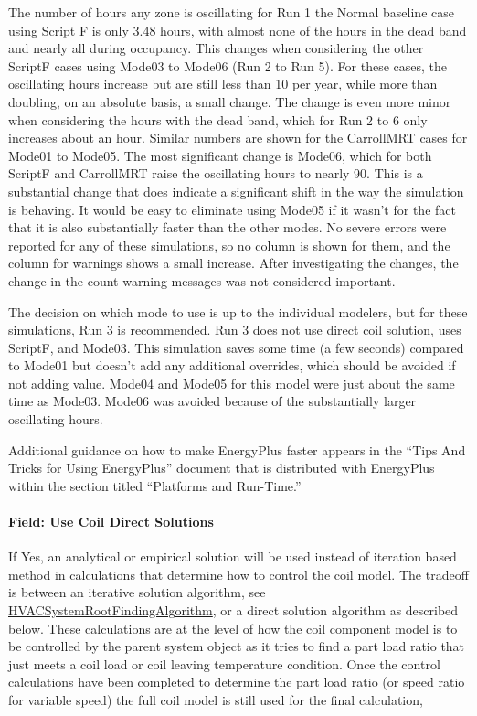 The number of hours any zone is oscillating for Run 1 the Normal baseline case using Script F is only 3.48 hours, with almost none of the hours in the dead band and nearly all during occupancy. This changes when considering the other ScriptF cases using Mode03 to Mode06 (Run 2 to Run 5).  For these cases, the oscillating hours increase but are still less than 10 per year, while more than doubling, on an absolute basis, a small change. The change is even more minor when considering the hours with the dead band, which for Run 2 to 6 only increases about an hour. Similar numbers are shown for the CarrollMRT cases for Mode01 to Mode05. The most significant change is Mode06, which for both ScriptF and CarrollMRT raise the oscillating hours to nearly 90. This is a substantial change that does indicate a significant shift in the way the simulation is behaving. It would be easy to eliminate using Mode05 if it wasn’t for the fact that it is also substantially faster than the other modes. No severe errors were reported for any of these simulations, so no column is shown for them, and the column for warnings shows a small increase. After investigating the changes, the change in the count warning messages was not considered important.

The decision on which mode to use is up to the individual modelers, but for these simulations, Run 3 is recommended. Run 3 does not use direct coil solution, uses ScriptF, and Mode03. This simulation saves some time (a few seconds) compared to Mode01 but doesn’t add any additional overrides, which should be avoided if not adding value. Mode04 and Mode05 for this model were just about the same time as Mode03.  Mode06 was avoided because of the substantially larger oscillating hours.

Additional guidance on how to make EnergyPlus faster appears in the ``Tips And Tricks for Using EnergyPlus'' document that is distributed with EnergyPlus within the section titled ``Platforms and Run-Time.''


\paragraph{Field: Use Coil Direct Solutions}\label{use-coil-direct-solutions}

If Yes, an analytical or empirical solution will be used instead of iteration based method in calculations that determine how to control the coil model.  The tradeoff is between an iterative solution algorithm, see \hyperref[hvacystemrootfindingalgorithm]{HVACSystemRootFindingAlgorithm}, or a direct solution algorithm as described below.  These calculations are at the level of how the coil component model is to be controlled by the parent system object as it tries to find a part load ratio that just meets a coil load or coil leaving temperature condition.  Once the control calculations have been completed to determine the part load ratio (or speed ratio for variable speed) the full coil model is still used for the final calculation,

